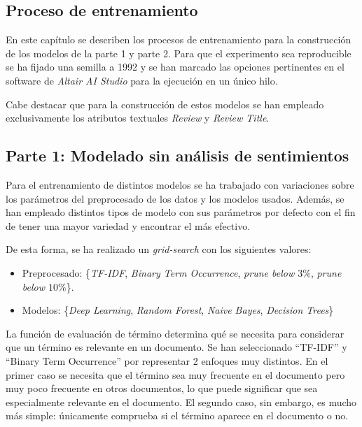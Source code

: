 \documentclass[es]{uc3mreport}
\begin{document}
\begin{report}
\section{Proceso de entrenamiento}
\label{chap:train}

En este capítulo se describen los procesos de entrenamiento para la construcción de los modelos de la parte 1 y parte 2. Para que el experimento sea reproducible se ha fijado una semilla a 1992 y se han marcado las opciones pertinentes en el software de \textit{Altair AI Studio} para la ejecución en un único hilo.

Cabe destacar que para la construcción de estos modelos se han empleado exclusivamente los atributos textuales \textit{Review} y \textit{Review Title}.

\subsection{Parte 1: Modelado sin análisis de sentimientos}
\label{sec:parte1}

    Para el entrenamiento de distintos modelos se ha trabajado con variaciones
    sobre los parámetros del preprocesado de los datos y los modelos usados.
    Además, se han empleado distintos tipos de modelo con sus
    parámetros por defecto con el fin de tener una mayor variedad y encontrar
    el más efectivo.

    De esta forma, se ha realizado un \textit{grid-search} con los siguientes valores:
    \begin{itemize}
        \item Preprocesado: \{\textit{TF-IDF}, \textit{Binary Term Occurrence}, \textit{prune below $3\%$}, \textit{prune below $10\%$}\}.
        \item Modelos: \{\textit{Deep Learning}, \textit{Random Forest}, \textit{Naive Bayes}, \textit{Decision Trees}\}
    \end{itemize}

    La función de evaluación de término determina qué se necesita para considerar
    que un término es relevante en un documento. Se han seleccionado ``TF-IDF'' y
    ``Binary Term Occurrence'' por representar 2 enfoques muy distintos. En el
    primer caso se necesita que el término sea muy frecuente en el documento pero
    muy poco frecuente en otros documentos, lo que puede significar que sea especialmente
    relevante en el documento. El segundo caso, sin embargo, es mucho más simple:
    únicamente comprueba si el término aparece en el documento o no.


\end{report}
\end{document}
